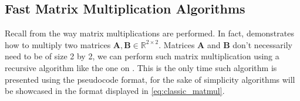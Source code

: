 
\renewcommand{\arraystretch}{0.8} %

\subsection{Fast Matrix Multiplication Algorithms} \label{sec:Fast Matrix Multiplication Algorithms}

    Recall from  the way matrix multiplications
    are performed. In fact,  demonstrates how to
    multiply two matrices $\mathbf{A, B} \in \mathbb{R}^{2\times2}$. Matrices
    $\mathbf{A}$ and $\mathbf{B}$ don't necessarily need to be of size 2 by 2,
    we can perform such matrix multiplication using a recursive algorithm like
    the one on . This is the only time such
    algorithm is presented using the pseudocode format, for the sake of
    simplicity algorithms will be showcased in the format displayed in
    \ref{eq:classic_matmul}.

